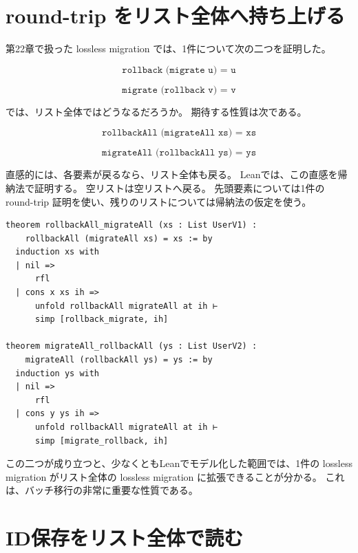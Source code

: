 
\section{round-trip をリスト全体へ持ち上げる}

第22章で扱った lossless migration では、1件について次の二つを証明した。

\[
  \texttt{rollback (migrate u) = u}
\]

\[
  \texttt{migrate (rollback v) = v}
\]

では、リスト全体ではどうなるだろうか。
期待する性質は次である。

\[
  \texttt{rollbackAll (migrateAll xs) = xs}
\]

\[
  \texttt{migrateAll (rollbackAll ys) = ys}
\]

直感的には、各要素が戻るなら、リスト全体も戻る。
Leanでは、この直感を帰納法で証明する。
空リストは空リストへ戻る。
先頭要素については1件の round-trip 証明を使い、残りのリストについては帰納法の仮定を使う。

\begin{listing}[htbp]
\begin{verbatim}
theorem rollbackAll_migrateAll (xs : List UserV1) :
    rollbackAll (migrateAll xs) = xs := by
  induction xs with
  | nil =>
      rfl
  | cons x xs ih =>
      unfold rollbackAll migrateAll at ih ⊢
      simp [rollback_migrate, ih]

theorem migrateAll_rollbackAll (ys : List UserV2) :
    migrateAll (rollbackAll ys) = ys := by
  induction ys with
  | nil =>
      rfl
  | cons y ys ih =>
      unfold rollbackAll migrateAll at ih ⊢
      simp [migrate_rollback, ih]
\end{verbatim}
\caption{1件の round-trip をリスト全体へ持ち上げる}
\label{lst:ch24-list-roundtrip}
\end{listing}

この二つが成り立つと、少なくともLeanでモデル化した範囲では、1件の lossless migration がリスト全体の lossless migration に拡張できることが分かる。
これは、バッチ移行の非常に重要な性質である。


\section{ID保存をリスト全体で読む}

